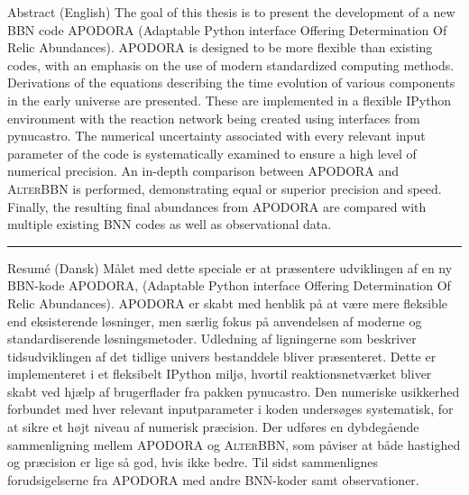 \thispagestyle{chapter}

\begin{multiabstract}{Abstract (English)} 
\noindent The goal of this thesis is to present the development of a new BBN code APODORA (Adaptable Python interface Offering Determination Of Relic Abundances). APODORA is designed to be more flexible than existing codes, with an emphasis on the use of modern standardized computing methods. Derivations of the equations describing the time evolution of various components in the early universe are presented. These are implemented in a flexible IPython environment with the reaction network being created using interfaces from pynucastro\cite{pynucastro2}. The numerical uncertainty associated with every relevant input parameter of the code is systematically examined to ensure a high level of numerical precision. An in-depth comparison between APODORA and \textsc{AlterBBN} is performed, demonstrating equal or superior precision and speed. Finally, the resulting final abundances from APODORA are compared with multiple existing BNN codes as well as observational data.

\end{multiabstract}


\plainbreak{2}

\begin{multiabstract}{Resumé (Dansk)}
\noindent Målet med dette speciale er at præsentere udviklingen af en ny BBN-kode APODORA, (Adaptable Python interface Offering Determination Of Relic Abundances). APODORA er skabt med henblik på at være mere fleksible end eksisterende løsninger, men særlig fokus på anvendelsen af moderne og standardiserende løsningsmetoder. Udledning af ligningerne som beskriver tidsudviklingen af det tidlige univers bestanddele bliver præsenteret. Dette er implementeret i et fleksibelt IPython miljø, hvortil reaktionsnetværket bliver skabt ved hjælp af brugerflader fra pakken pynucastro\cite{pynucastro2}. Den numeriske usikkerhed forbundet med hver relevant inputparameter i koden undersøges systematisk, for at sikre et højt niveau af numerisk præcision. Der udføres en dybdegående sammenligning mellem APODORA og \textsc{AlterBBN}, som påviser at både hastighed og præcision er lige så god, hvis ikke bedre. Til sidst sammenlignes forudsigelserne fra APODORA med andre BNN-koder samt observationer.

\end{multiabstract}

